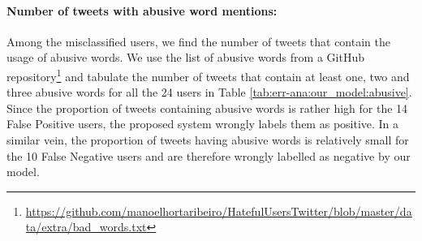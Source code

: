 \paragraph{Number of tweets with abusive word mentions:}
Among the misclassified users, we find the number of tweets that contain the usage of abusive words. We use the list of abusive words from a GitHub repository\footnote{\url{https://github.com/manoelhortaribeiro/HatefulUsersTwitter/blob/master/data/extra/bad_words.txt}} and tabulate the number of tweets that contain at least one, two and three abusive words for all the 24 users in Table \ref{tab:err-ana:our_model:abusive}.
Since the proportion of tweets containing abusive words is rather high for the 14 False Positive users, the proposed system wrongly labels them as positive. In a similar vein, the proportion of tweets having abusive words is relatively small for the 10 False Negative users and are therefore wrongly labelled as negative by our model.




